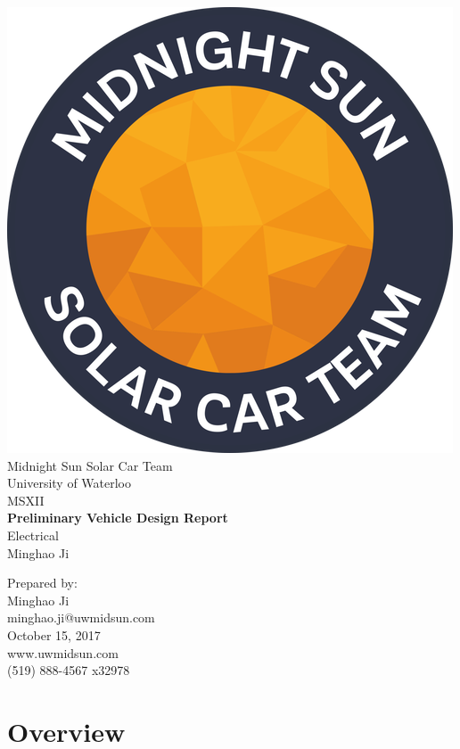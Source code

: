 \documentclass[10pt]{article}
\makeatletter
\newcommand\theteamname{Midnight Sun Solar Car Team} %
\newcommand\theuniversityname{University of Waterloo} %
\newcommand\theteamwebsite{www.uwmidsun.com} %
\newcommand\theteamphone{(519) 888-4567 x32978} %
\newcommand\thetitle{Preliminary Vehicle Design Report} %
\newcommand\thesubtitle{Electrical} %
\newcommand\theauthor{Minghao Ji} %
\newcommand\theauthorcontact{minghao.ji@uwmidsun.com} %
\newcommand\thedate{October 15, 2017} %
\makeatother
\begin{document}
\begin{titlepage}
\large
\vspace*{2cm}
\centering
\includegraphics[width=.25\textwidth]{./figures/midnightSunLogoCircle.png} \\
\vspace{1.5cm}
{\LARGE \theteamname} \\
\theuniversityname \\
\vspace{2.2cm}
{\LARGE MSXII} \\
\vspace{0.4cm}
{\huge\bfseries \thetitle} \\
\vspace{0.2cm}
{\LARGE \thesubtitle} \\
\vspace{2.2cm}
\ifdefined \theauthor
\par Prepared by: \\
\theauthor \\
\theauthorcontact \\
\fi
\thedate \\
\vfill
\theteamwebsite \\
\theteamphone
\end{titlepage}

\tableofcontents

\section{Overview}
\end{document}
